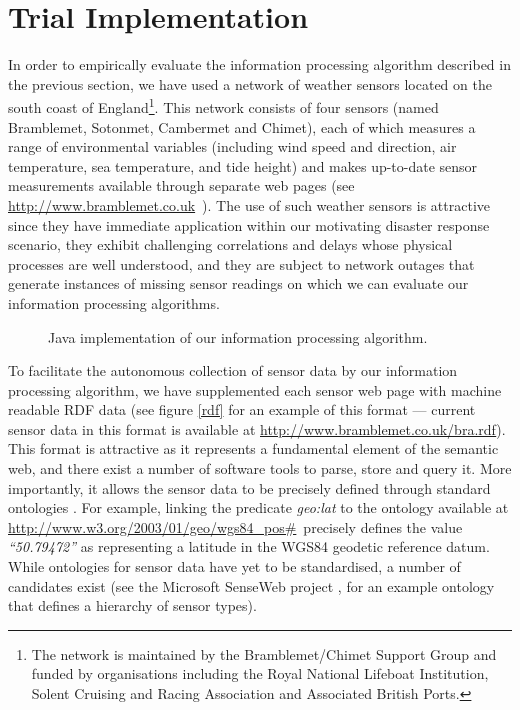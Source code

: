 \documentclass{acmtrans2m}
\begin{document}
\section{Trial Implementation}\label{sec_implementation}

\noindent In order to empirically evaluate the information processing algorithm described in the previous section, we have used a network of weather sensors located on the south coast of England\footnote{The network is maintained by the Bramblemet/Chimet Support Group and funded by organisations including the Royal National Lifeboat Institution, Solent Cruising and Racing Association and Associated British Ports.}. This network consists of four sensors (named Bramblemet, Sotonmet, Cambermet and Chimet), each of which measures a range of environmental variables (including wind speed and direction, air temperature, sea temperature, and tide height) and makes up-to-date sensor measurements available through separate web pages (see \small\url{http://www.bramblemet.co.uk}\normalsize~). The use of such weather sensors is attractive since they have immediate application within our motivating disaster response scenario, they exhibit challenging correlations and delays whose physical processes are well understood, and they are subject to network outages that generate instances of missing sensor readings on which we can evaluate our information processing algorithms.

\begin{figure}[tp!]
\begin{center}
\caption{Java implementation of our information processing algorithm.}
\label{screen}
\end{center}
\end{figure}

To facilitate the autonomous collection of sensor data by our information processing algorithm, we have supplemented each sensor web page with machine readable RDF data (see figure \ref{rdf} for an example of this format --- current sensor data in this format is available at \small\url{http://www.bramblemet.co.uk/bra.rdf}\normalsize). This format is attractive as it represents a fundamental element of the semantic web, and there exist a number of software tools to parse, store and query it. More importantly, it allows the sensor data to be precisely defined through standard ontologies \cite{rdf,semantic}. For example, linking the predicate {\em geo:lat} to the ontology available at \small\url{http://www.w3.org/2003/01/geo/wgs84_pos#}\normalsize ~precisely defines the value {\em ``50.79472''} as representing a latitude in the WGS84 geodetic reference datum. While ontologies for sensor data have yet to be standardised, a number of candidates exist (see the Microsoft SenseWeb project \cite{senseweb}, for an example ontology that defines a hierarchy of sensor types).
\end{document}
